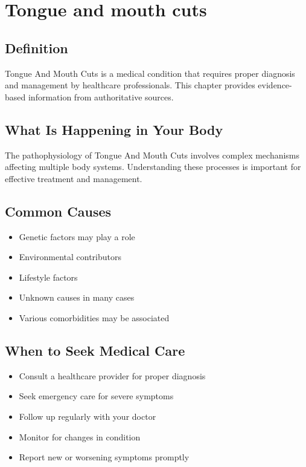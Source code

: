 
\chapter{Tongue and mouth cuts}

\section*{Definition}
Tongue And Mouth Cuts is a medical condition that requires proper diagnosis and management by healthcare professionals. This chapter provides evidence-based information from authoritative sources.

\section*{What Is Happening in Your Body}
The pathophysiology of Tongue And Mouth Cuts involves complex mechanisms affecting multiple body systems. Understanding these processes is important for effective treatment and management.

\section*{Common Causes}
\begin{itemize}
  \item Genetic factors may play a role
  \item Environmental contributors
  \item Lifestyle factors
  \item Unknown causes in many cases
  \item Various comorbidities may be associated
\end{itemize}

\section*{When to Seek Medical Care}
\begin{itemize}
  \item Consult a healthcare provider for proper diagnosis
  \item Seek emergency care for severe symptoms
  \item Follow up regularly with your doctor
  \item Monitor for changes in condition
  \item Report new or worsening symptoms promptly
\end{itemize}

